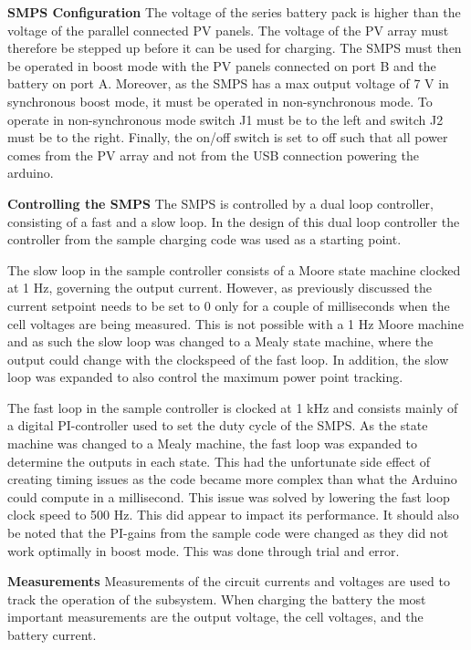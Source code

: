 \documentclass[a4paper]{article}
\begin{document}
\textbf{SMPS Configuration}
\vspace{10pt} 
\newline
The voltage of the series battery pack is higher than the voltage of the parallel connected
PV panels. The voltage of the PV array must therefore be stepped up before it can be used
for charging. The SMPS must then be operated in boost mode with the
PV panels connected on port B and the battery on port A. Moreover, as the 
SMPS has a max output voltage of 7 V in synchronous boost mode\cite{powerLogbook}, 
it must be operated in non-synchronous mode. To operate in non-synchronous mode switch J1
must be to the left and switch J2 must be to the right. Finally, the on/off switch is 
set to off such that all power comes from the PV array and not from the USB connection 
powering the arduino.

\textbf{Controlling the SMPS}
\vspace{10pt} 
\newline
The SMPS is controlled by a dual loop controller, consisting of a fast and a slow loop.
In the design of this dual loop controller the controller from the sample charging code
was used as a starting point\cite{chargeCode}. 

The slow loop in the sample controller consists
of a Moore state machine clocked at 1 Hz, governing the output current. However, as previously
discussed the current setpoint needs to be set to 0 only for a couple of milliseconds when
the cell voltages are being measured. This is not possible with a 1 Hz Moore machine and
as such the slow loop was changed to a Mealy state machine, where the output could change
with the clockspeed of the fast loop. In addition, the slow loop was expanded to also control
the maximum power point tracking.

The fast loop in the sample controller is clocked at 1 kHz and consists mainly of a 
digital PI-controller used to set the duty cycle of the SMPS. As the state machine 
was changed to a Mealy machine, the fast loop was expanded to determine the outputs in
each state. This had the unfortunate side effect of creating timing issues as the code
became more complex than what the Arduino could compute in a millisecond. This issue was
solved by lowering the fast loop clock speed to 500 Hz. This did appear to impact its
performance.
It should also be noted that the PI-gains from the sample code were changed as they did
not work optimally in boost mode. This was done through trial and error.

\textbf{Measurements}
\vspace{10pt} 
\newline
Measurements of the circuit currents and voltages are used to track the operation of the
subsystem. When charging the battery the most important measurements are the output voltage,
the cell voltages, and the battery current.
\end{document}

